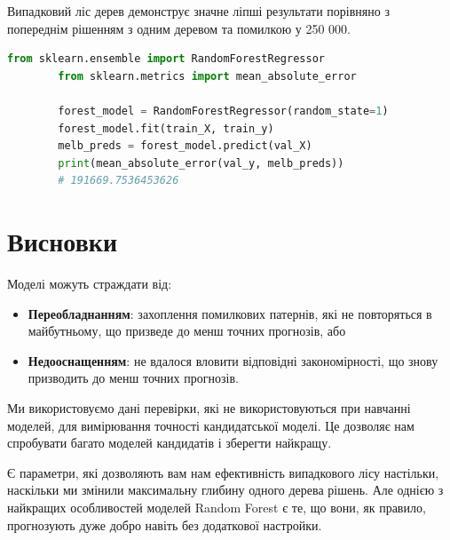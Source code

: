 \documentclass[11pt]{article}
\begin{document}
    Випадковий ліс дерев демонструє значне ліпші результати порівняно з попереднім рішенням з одним деревом та помилкою у 250 000.

    \begin{lstlisting}[style=light, language=Python,label={lst:vectorimg},caption=Random Forest Tree]
        from sklearn.ensemble import RandomForestRegressor
        from sklearn.metrics import mean_absolute_error

        forest_model = RandomForestRegressor(random_state=1)
        forest_model.fit(train_X, train_y)
        melb_preds = forest_model.predict(val_X)
        print(mean_absolute_error(val_y, melb_preds))
        # 191669.7536453626
    \end{lstlisting}


    \section{Висновки}\label{sec:conclusion}
    Моделі можуть страждати від:

    \begin{itemize}
        \item \textbf{Переобладнанням}: захоплення помилкових патернів, які не повторяться в майбутньому, що призведе до менш точних прогнозів, або
        \item \textbf{Недооснащенням}: не вдалося вловити відповідні закономірності, що знову призводить до менш точних прогнозів.
    \end{itemize}
    Ми використовуємо дані перевірки, які не використовуються при навчанні моделей, для вимірювання точності кандидатської моделі.
    Це дозволяє нам спробувати багато моделей кандидатів і зберегти найкращу.

    Є параметри, які дозволяють вам нам ефективність випадкового лісу настільки, наскільки ми змінили максимальну глибину одного дерева рішень.
    Але однією з найкращих особливостей моделей Random Forest є те, що вони, як правило, прогнозують дуже добро навіть без додаткової настройки.
\end{document}
